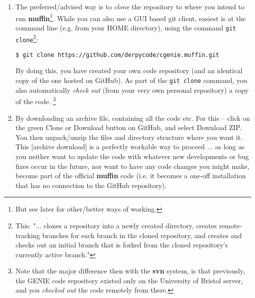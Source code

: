 \documentclass[11pt,fleqn]{book} %
\begin{document}
\begin{enumerate}

\vspace{1mm}
\item The preferred/advised way is to \textit{clone} the repository to where you intend to run \textbf{muffin}\footnote{But see later for other/better ways of working.}. While you can also use a GUI based git client, easiest is at the command line (e.g. from your HOME directory), using the command \texttt{git clone}\footnote{This: "... clones a repository into a newly created directory, creates remote-tracking branches for each branch in the cloned repository, and creates and checks out an initial branch that is forked from the cloned repository’s currently active branch."}:
\vspace{-1mm}
\begin{verbatim}
$ git clone https://github.com/derpycode/cgenie.muffin.git
\end{verbatim}
\vspace{-1mm}

By doing this, you have created your own code repository (and an identical copy of the one hosted on GitHub). As part of the \texttt{git clone} command, you also automatically \textit{check out} (from your very own personal repository) a copy of the code. \footnote{Note that the major difference then with the \textbf{svn} system, is that previously, the GENIE code repository existed only on the University of Bristol server, and you \textit{checked out} the code remotely from there.}

\vspace{1mm}
\item By downloading an archive file, containing all the code etc. For this -- click on the \textcolor[rgb]{0,0.501961,0}{green} \textsf{\footnotesize Clone or Download} button on GitHub, and select \textsf{\footnotesize Download ZIP}.
\\You then unpack/unzip the files and directory structure where you want it.
\\This [archive download] is a perfectly workable way to proceed ... as long as you neither want to update the code with whatever new developments or bug fixes occur in the future, nor want to have any code changes you might make, become part of the official \textbf{muffin} code  (i.e. it becomes a one-off installation that has no connection to the GitHub repository).

\end{enumerate}
\end{document}
